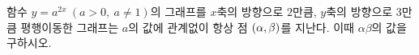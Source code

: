 함수 $y=a^{2x}\ (a>0,\ a\ne 1)$의 그래프를 $x$축의 방향으로 $2$만큼, $y$축의 방향으로 $3$만큼 평행이동한 그래프는 $a$의 값에 관계없이 항상 점 $(\alpha{,}\mkern3mu\mathopen{}\beta)$를 지난다. 이때 $\alpha\beta$의 값을 구하시오.
